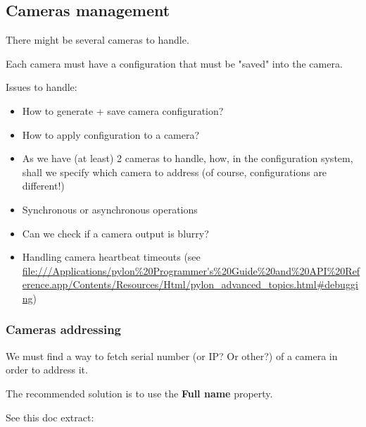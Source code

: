 \subsection{Cameras management}

There might be several cameras to handle.

Each camera must have a configuration that must be "saved" into the camera.

Issues to handle:

\begin{itemize}
    \item How to generate + save camera configuration?
    \item How to apply configuration to a camera?
    \item As we have (at least) 2 cameras to handle, how, in the configuration system,
        shall we specify which camera to address (of course, configurations are different!)
    \item Synchronous or asynchronous operations
    \item Can we check if a camera output is blurry?
    \item Handling camera heartbeat timeouts (see \url{file:///Applications/pylon%20Programmer's%20Guide%20and%20API%20Reference.app/Contents/Resources/Html/pylon_advanced_topics.html#debugging})
\end{itemize}

\subsubsection{Cameras addressing}

We must find a way to fetch serial number (or IP? Or other?) of a camera in order to address it.

The recommended solution is to use the \textbf{Full name} property.

See this doc extract:

